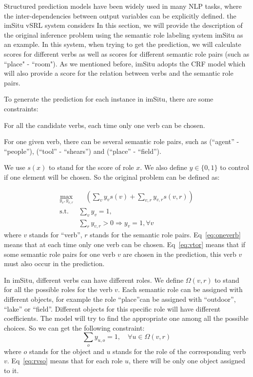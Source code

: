 Structured prediction models have been widely used in many NLP tasks, where the inter-dependencies between output variables can be explicitly defined. the imSitu vSRL system considers 
In this section, we will provide the description of the original inference problem using the semantic role labeling system imSitu as an example. 
In this system, when trying to get the prediction, we will calculate scores for different verbs as well as scores for different semantic role pairs (such as ``place" - ``room"). As we mentioned before, imSitu adopts the CRF model which will also provide a score for the relation between verbs and the semantic role pairs.

To generate the prediction for each instance in imSitu, there are some constraints:
\begin{compactitem}
    \item For all the candidate verbs, each time only one verb can be chosen.
    \item For one given verb, there can be several semantic role pairs, such as (``agent'' - ``people''), (``tool'' - ``shears'') and (``place'' - ``field''). 
\end{compactitem}

We use $s(x)$ to stand for the score of role $x$. We also define $y \in \{0,1\}$ to control if one element will be chosen. So the original problem can be defined as:

\begin{subequations}
\label{eq:ori}
\begin{align}
    \max_{y_v, y_{v,r}} & \quad {(\sum_v y_v s(v) + \sum_{v,r}y_{v,r}s(v,r))} \label{eq:obj} \\        
    \text{s.t.} 
        & \sum_v y_v = 1, \label{eq:oneverb}\\           
        & \sum_r y_{v,r} > 0 \Longrightarrow y_v = 1,  \forall v  \label{eq:vtor}
\end{align}
\end{subequations}
where $v$ stands for ``verb'', $r$ stands for the semantic role pairs. 
Eq~\eqref{eq:oneverb} means that at each time only one verb can be chosen. Eq~\eqref{eq:vtor} means that if some semantic role pairs for one verb $v$ are chosen in the prediction, this verb $v$ must also occur in the prediction.


In imSitu, different verbs can have different roles. We define  $\Omega(v,r)$ to stand for all the possible roles for the verb $v$. Each semantic role can be assigned with different objects, for example the role ``place''can be assigned with ``outdoor'', ``lake'' or ``field''. Different objects for this specific role will have different coefficients. The model will try to find the appropriate one among all the possible choices. So we can get the following constraint:
\begin{equation}
\sum_o y_{u,o} = 1, \quad \forall u \in \Omega(v,r)
\label{eq:rvso}
\end{equation}
where $o$ stands for the object and $u$ stands for the role of the corresponding verb $v$. Eq~\eqref{eq:rvso} means that for each role $u$, there will be only one object assigned to it.


